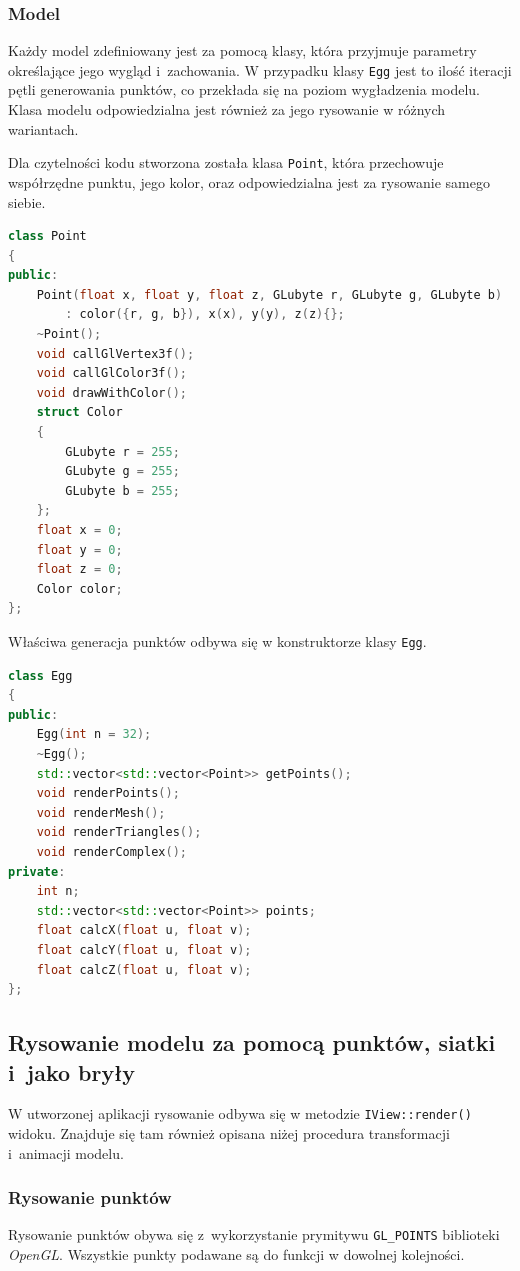 \subsubsection{Model}
Każdy model zdefiniowany jest za pomocą klasy, która przyjmuje parametry określające jego wygląd i~zachowania. W przypadku klasy \lstinline{Egg} jest to ilość iteracji pętli generowania punktów, co przekłada się na poziom wygładzenia modelu. Klasa modelu odpowiedzialna jest również za jego rysowanie w różnych wariantach.

Dla czytelności kodu stworzona została klasa \lstinline{Point}, która przechowuje współrzędne punktu, jego kolor, oraz odpowiedzialna jest za rysowanie samego siebie.

\begin{lstlisting}[language=C++, caption=Nagłówek klasy Point.]
class Point
{
public:
    Point(float x, float y, float z, GLubyte r, GLubyte g, GLubyte b)
        : color({r, g, b}), x(x), y(y), z(z){};
    ~Point();
    void callGlVertex3f();
    void callGlColor3f();
    void drawWithColor();
    struct Color
    {
        GLubyte r = 255;
        GLubyte g = 255;
        GLubyte b = 255;
    };
    float x = 0;
    float y = 0;
    float z = 0;
    Color color;
};
\end{lstlisting}
Właściwa generacja punktów odbywa się w konstruktorze klasy \lstinline{Egg}.
\begin{lstlisting}[language=C++, caption=Nagłówek klasy modelu Egg.]
class Egg
{
public:
    Egg(int n = 32);
    ~Egg();
    std::vector<std::vector<Point>> getPoints();
    void renderPoints();
    void renderMesh();
    void renderTriangles();
    void renderComplex();
private:
    int n;
    std::vector<std::vector<Point>> points;
    float calcX(float u, float v);
    float calcY(float u, float v);
    float calcZ(float u, float v);
};
\end{lstlisting}
\newpage
\subsection{Rysowanie modelu za pomocą punktów, siatki i~jako bryły}

W utworzonej aplikacji rysowanie odbywa się w metodzie \lstinline{IView::render()} widoku. Znajduje się tam również opisana niżej procedura transformacji i~animacji modelu.
\subsubsection{Rysowanie punktów}
Rysowanie punktów obywa się z~wykorzystanie prymitywu \lstinline{GL_POINTS} biblioteki \textit{OpenGL}. Wszystkie punkty podawane są do funkcji w dowolnej kolejności.

